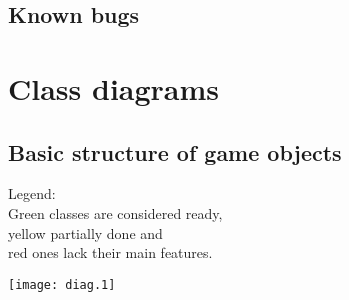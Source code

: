 \documentclass[11pt,a4paper,oneside]{report}
\begin{document}
\section{Known bugs}

\chapter{Class diagrams}
\section{Basic structure of game objects}
Legend:
\\\colorbox{gr}{Green} classes are considered ready, 
\\\colorbox{ye}{yellow} partially done and 
\\\colorbox{re}{red} ones lack their main features.

\texttt{[image: diag.1]}

	
\end{document}
